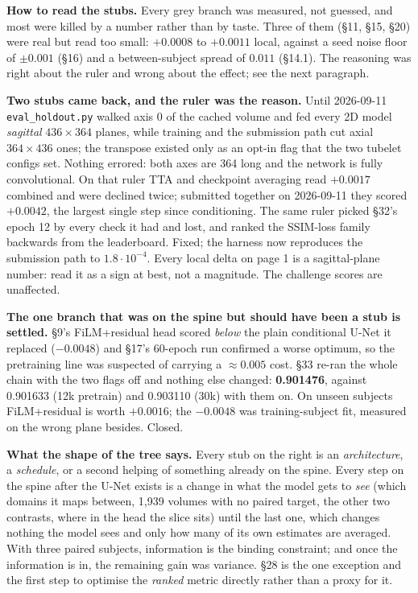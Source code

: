 \documentclass[10pt,a4paper]{article}
\begin{document}
\newpage
{\footnotesize\setlength{\parskip}{1.6mm}
\textbf{How to read the stubs.} Every grey branch was measured, not guessed, and most were
killed by a number rather than by taste. Three of them (\S11, \S15, \S20) were real but read
too small: $+0.0008$ to $+0.0011$ local, against a seed noise floor of $\pm0.001$ (\S16) and a
between-subject spread of $0.011$ (\S14.1). The reasoning was right about the ruler and wrong
about the effect; see the next paragraph.

\textbf{Two stubs came back, and the ruler was the reason.} Until 2026-09-11
\texttt{eval\_holdout.py} walked axis 0 of the cached volume and fed every 2D model
\emph{sagittal} $436\times364$ planes, while training and the submission path cut axial
$364\times436$ ones; the transpose existed only as an opt-in flag that the two tubelet configs
set. Nothing errored: both axes are 364 long and the network is fully convolutional. On that
ruler TTA and checkpoint averaging read $+0.0017$ combined and were declined twice; submitted
together on 2026-09-11 they scored $+0.0042$, the largest single step since conditioning. The
same ruler picked \S32's epoch 12 by every check it had and lost, and ranked the SSIM-loss
family backwards from the leaderboard. Fixed; the harness now reproduces the submission path
to $1.8\cdot10^{-4}$. Every local delta on page 1 is a sagittal-plane number: read it as a
sign at best, not a magnitude. The challenge scores are unaffected.

\textbf{The one branch that was on the spine but should have been a stub is settled.} \S9's
FiLM+residual head scored \emph{below} the plain conditional U-Net it replaced ($-0.0048$) and
\S17's 60-epoch run confirmed a worse optimum, so the pretraining line was suspected of
carrying a $\approx0.005$ cost. \S33 re-ran the whole chain with the two flags off and nothing
else changed: \textbf{0.901476}, against 0.901633 (12k pretrain) and 0.903110 (30k) with them
on. On unseen subjects FiLM+residual is worth $+0.0016$; the $-0.0048$ was training-subject
fit, measured on the wrong plane besides. Closed.

\textbf{What the shape of the tree says.} Every stub on the right is an \emph{architecture},
a \emph{schedule}, or a second helping of something already on the spine. Every step on the
spine after the U-Net exists is a change in what the model gets to \emph{see} (which domains
it maps between, 1{,}939 volumes with no paired target, the other two contrasts, where in the
head the slice sits) until the last one, which changes nothing the model sees and only how
many of its own estimates are averaged. With three paired subjects, information is the binding
constraint; and once the information is in, the remaining gain was variance. \S28 is the one
exception and the first step to optimise the \emph{ranked} metric directly rather than a proxy
for it.

}
\end{document}
